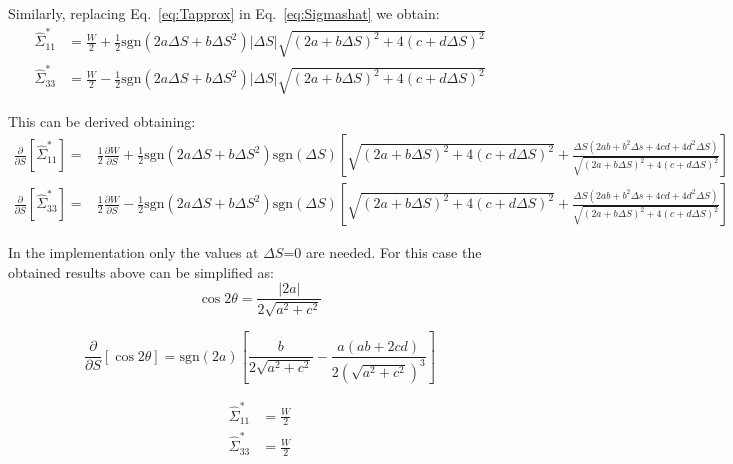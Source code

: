 Similarly, replacing Eq.~\ref{eq:Tapprox} in Eq.~\ref{eq:Sigmashat} we obtain:
\begin{align}
\hat{\Sigma}^*_{11} &= \frac{W}{2} + \frac{1}{2} \mathrm{sgn}\left(2a\Delta S + b \Delta S^2\right)\left| \Delta S\right| \sqrt{\left(2a +b \Delta S \right)^2 +4\left( c +d \Delta S\right)^2}\\
\hat{\Sigma}^*_{33} &= \frac{W}{2} - \frac{1}{2} \mathrm{sgn}\left(2a\Delta S + b \Delta S^2\right)\left| \Delta S\right| \sqrt{\left(2a +b \Delta S \right)^2 +4\left( c +d \Delta S\right)^2}\label{eq:SigmasSing}
\end{align}

This can be derived obtaining:
\begin{align}
\frac{\partial }{\partial S} \left[\hat{\Sigma}^*_{11} \right] =& \frac{1}{2}\frac{\partial W }{\partial S}
+\frac{1}{2}\mathrm{sgn}\left(2a\Delta S +b \Delta S^2 \right)\mathrm{sgn}(\Delta S)\left[
\sqrt{\left(2a +b \Delta S \right)^2 +4\left( c +d \Delta S\right)^2}+\frac{\Delta S \left(2ab+b^2 \Delta s +4 c d+ 4 d^2 \Delta S \right)}{\sqrt{\left(2a +b \Delta S \right)^2 +4\left( c +d \Delta S\right)^2}}
\right] \\
\frac{\partial }{\partial S} \left[\hat{\Sigma}^*_{33} \right] =& \frac{1}{2}\frac{\partial W }{\partial S}
-\frac{1}{2}\mathrm{sgn}\left(2a\Delta S +b \Delta S^2 \right)\mathrm{sgn}(\Delta S)\left[
\sqrt{\left(2a +b \Delta S \right)^2 +4\left( c +d \Delta S\right)^2}+\frac{\Delta S \left(2ab+b^2 \Delta s +4 c d+ 4 d^2 \Delta S \right)}{\sqrt{\left(2a +b \Delta S \right)^2 +4\left( c +d \Delta S\right)^2}}
\right] 
\end{align}

In the implementation only the values at $\Delta S$=0 are needed. For this case the obtained results above can be simplified as:
\begin{equation}
\cos 2 \theta = \frac{\left| 2a\right|}{2\sqrt{a^2 + c^2}}
\end{equation}

\begin{equation}
\frac{\partial }{\partial S} \left[ \cos 2\theta \right] = \mathrm{sgn}(2a)\left[
\frac{b}{2\sqrt{a^2 + c^2 }}-\frac{a(ab+2cd)}{2\left(\sqrt{a^2 + c^2}\right)^3}
\right]
\end{equation}

\begin{align}
\hat{\Sigma}^*_{11} &= \frac{W}{2}\\
\hat{\Sigma}^*_{33} &= \frac{W}{2}
\end{align}

